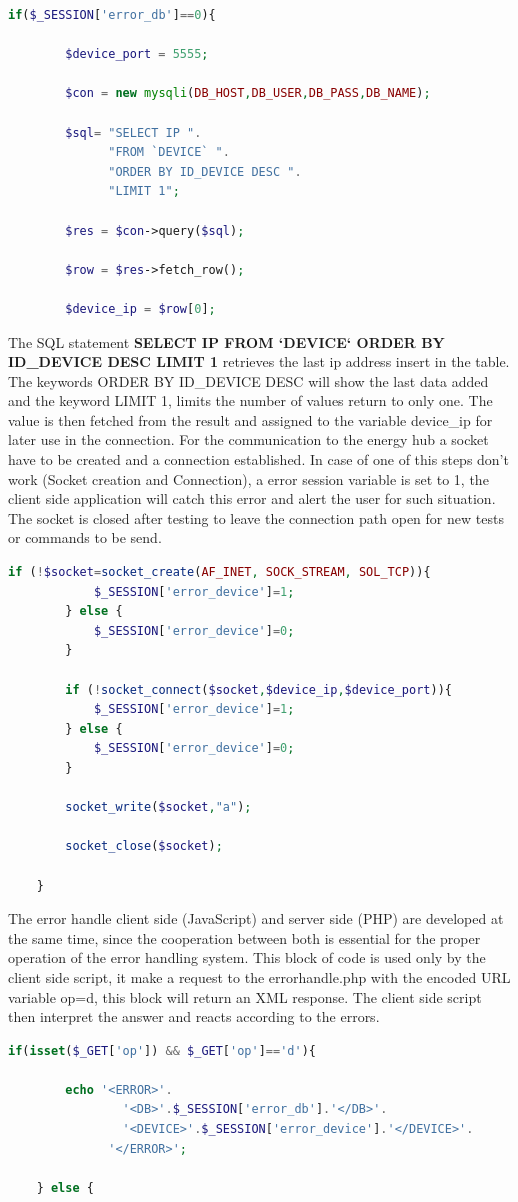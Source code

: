 \begin{lstlisting}[language=php]
if($_SESSION['error_db']==0){
		
		$device_port = 5555;
		
		$con = new mysqli(DB_HOST,DB_USER,DB_PASS,DB_NAME);
		
		$sql= "SELECT IP ". 
			  "FROM `DEVICE` ". 
			  "ORDER BY ID_DEVICE DESC ".
			  "LIMIT 1";
		
		$res = $con->query($sql);
		
		$row = $res->fetch_row();
		
		$device_ip = $row[0];
\end{lstlisting}

The SQL statement  \textbf{SELECT IP FROM `DEVICE` ORDER BY ID\_DEVICE DESC LIMIT 1} retrieves the last ip address insert in the table. The keywords ORDER BY ID\_DEVICE DESC will show the last data added and the keyword LIMIT 1, limits the number of values return to only one. The value is then fetched from the result and assigned to the variable device\_ip for later use in the connection.
\p
For the communication to the energy hub a socket have to be created and a connection established. In case of one of this steps don't work (Socket creation and Connection), a error session variable is set to 1, the client side application will catch this error and alert the user for such situation. The socket is closed after testing to leave the connection path open for new tests or commands to be send.

\begin{lstlisting}[language=php]
		if (!$socket=socket_create(AF_INET, SOCK_STREAM, SOL_TCP)){
			$_SESSION['error_device']=1;
		} else {
			$_SESSION['error_device']=0;
		}
	
		if (!socket_connect($socket,$device_ip,$device_port)){
			$_SESSION['error_device']=1;
		} else {
			$_SESSION['error_device']=0;
		}
		
		socket_write($socket,"a");
		
		socket_close($socket);
	
	}
\end{lstlisting}

The error handle client side (JavaScript) and server side (PHP) are developed at the same time, since the cooperation between both is essential for the proper operation of the error handling system.
\p
This block of code is used only by the client side script, it make a request to the errorhandle.php with the encoded URL variable op=d, this block will return an XML response. The client side script then interpret the answer and reacts according to the errors.
\begin{lstlisting}[language=php]
	if(isset($_GET['op']) && $_GET['op']=='d'){
		
		echo '<ERROR>'.
			    '<DB>'.$_SESSION['error_db'].'</DB>'.
				'<DEVICE>'.$_SESSION['error_device'].'</DEVICE>'.
			  '</ERROR>';
		
	} else {
\end{lstlisting}

